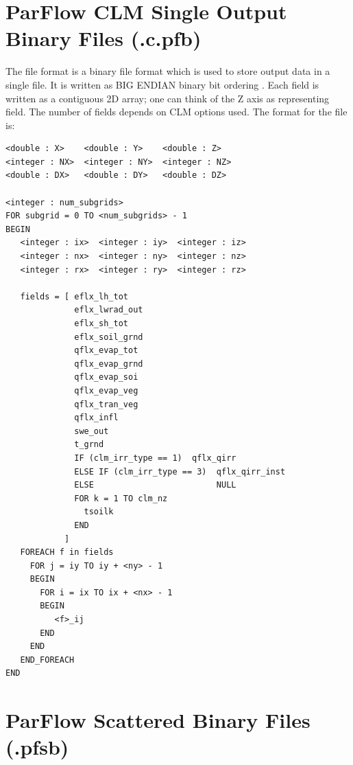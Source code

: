 \section{ParFlow CLM Single Output Binary Files (.c.pfb)}
\label{ParFlow Binary Files (.c.pfb)}

The  file format is a binary file format which is used to
store  output data in a single file.  It is written as BIG
ENDIAN binary bit ordering \cite{endian}.  Each field is written as a
contiguous 2D array; one can think of the Z axis as representing
field.  The number of fields depends on CLM options used.  The format
for the file is:

\begin{display}\begin{verbatim}
<double : X>    <double : Y>    <double : Z>
<integer : NX>  <integer : NY>  <integer : NZ>
<double : DX>   <double : DY>   <double : DZ>

<integer : num_subgrids>
FOR subgrid = 0 TO <num_subgrids> - 1
BEGIN
   <integer : ix>  <integer : iy>  <integer : iz>
   <integer : nx>  <integer : ny>  <integer : nz>
   <integer : rx>  <integer : ry>  <integer : rz>

   fields = [ eflx_lh_tot
              eflx_lwrad_out
              eflx_sh_tot
              eflx_soil_grnd
              qflx_evap_tot
              qflx_evap_grnd
              qflx_evap_soi
              qflx_evap_veg
              qflx_tran_veg
              qflx_infl
              swe_out
              t_grnd
              IF (clm_irr_type == 1)  qflx_qirr
              ELSE IF (clm_irr_type == 3)  qflx_qirr_inst
              ELSE                         NULL
              FOR k = 1 TO clm_nz
                tsoilk
              END
            ]
   FOREACH f in fields
     FOR j = iy TO iy + <ny> - 1
     BEGIN
       FOR i = ix TO ix + <nx> - 1
       BEGIN
          <f>_ij
       END
     END
   END_FOREACH
END
\end{verbatim}\end{display}


\section{ParFlow Scattered Binary Files (.pfsb)}
\label{ParFlow Scattered Binary Files (.pfsb)}

